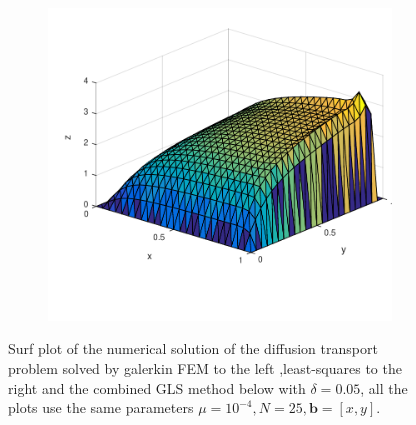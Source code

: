 \begin{figure}[h!]
\begin{subfigure}[b]{0.48\textwidth}
  \end{subfigure}
  \begin{subfigure}[b]{0.48\textwidth}
	\includegraphics[width=\textwidth]{Figures/GLSFEM_difftrans_aPos.pdf}
  \end{subfigure}
  \vspace{-0.1\baselineskip}
  \caption{Surf plot of the numerical solution of the diffusion transport problem solved by galerkin FEM to the left ,least-squares to the right and the combined GLS method below with $\delta = 0.05$, all the plots use the same parameters $\mu = 10^{-4}, N=25,\mathbf{b} = [x,y]$.}
  \label{fig:SurfDiffTransPositiveFEM}
\end{figure}

